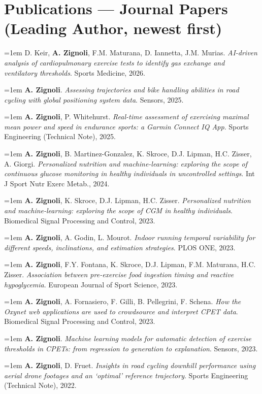 \documentclass[10pt,a4paper]{article}
\newcommand{\pub}[3]{%
  \hangindent=1em\hangafter=1
  \small #1. \textit{#2}. #3.\par\vspace{3pt}%
}
\begin{document}
\section{Publications — Journal Papers (Leading Author, newest first)}

\pub{D. Keir, \textbf{A. Zignoli}, F.M. Maturana, D. Iannetta, J.M. Murias}{AI-driven analysis of cardiopulmonary exercise tests to identify gas exchange and ventilatory thresholds}{Sports Medicine, 2026}

\pub{\textbf{A. Zignoli}}{Assessing trajectories and bike handling abilities in road cycling with global positioning system data}{Sensors, 2025}

\pub{\textbf{A. Zignoli}, P. Whitehurst}{Real-time assessment of exercising maximal mean power and speed in endurance sports: a Garmin Connect IQ App}{Sports Engineering (Technical Note), 2025}

\pub{\textbf{A. Zignoli}, B. Martinez-Gonzalez, K. Skroce, D.J. Lipman, H.C. Zisser, A. Giorgi}{Personalized nutrition and machine-learning: exploring the scope of continuous glucose monitoring in healthy individuals in uncontrolled settings}{Int J Sport Nutr Exerc Metab., 2024}

\pub{\textbf{A. Zignoli}, K. Skroce, D.J. Lipman, H.C. Zisser}{Personalized nutrition and machine-learning: exploring the scope of CGM in healthy individuals}{Biomedical Signal Processing and Control, 2023}

\pub{\textbf{A. Zignoli}, A. Godin, L. Mourot}{Indoor running temporal variability for different speeds, inclinations, and estimation strategies}{PLOS ONE, 2023}

\pub{\textbf{A. Zignoli}, F.Y. Fontana, K. Skroce, D.J. Lipman, F.M. Maturana, H.C. Zisser}{Association between pre-exercise food ingestion timing and reactive hypoglycemia}{European Journal of Sport Science, 2023}

\pub{\textbf{A. Zignoli}, A. Fornasiero, F. Gilli, B. Pellegrini, F. Schena}{How the Oxynet web applications are used to crowdsource and interpret CPET data}{Biomedical Signal Processing and Control, 2023}

\pub{\textbf{A. Zignoli}}{Machine learning models for automatic detection of exercise thresholds in CPETs: from regression to generation to explanation}{Sensors, 2023}

\pub{\textbf{A. Zignoli}, D. Fruet}{Insights in road cycling downhill performance using aerial drone footages and an `optimal' reference trajectory}{Sports Engineering (Technical Note), 2022}
\end{document}
